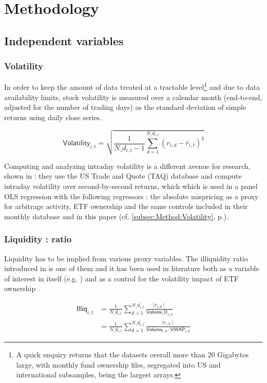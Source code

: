 \section{Methodology}
\label{sec:Methodology}
\subsection{Independent variables}
\subsubsection{Volatility}
In order to keep the amount of data treated at a tractable level\footnote{A quick enquiry returns that the datasets overall more than 20 Gigabytes large, with monthly fund ownership files, segregated into US and international subsamples, being the largest arrays.} and due to data availability limits, stock volatility is measured over a calendar month (end-to-end, adjusted for the number of trading days) as the standard deviation of simple returns using daily close series.

\begin{equation}
  \mathsf{Volatility}_{i, t} = \sqrt{\frac{1}{N\_d_{i, t} - 1} \sum_{d = 1}^{N\_d_{i, t}} (r_{i, d} - \bar{r}_{i, t})^2}
  \end{equation}

Computing and analyzing intraday volatility is a different avenue for research, shown in \textcite{Ben-David2018} : they use the US Trade and Quote (TAQ) database and compute intraday volatility over second-by-second returns, which which is used in a panel OLS regression with the following regressors : the absolute mispricing as a proxy for arbitrage activity, ETF ownership and the same controls included in their monthly database and in this paper (cf. \autoref{subsec:Method:Volatility}, p.\pageref{subsec:Method:Volatility}).
\subsubsection{Liquidity : \textcite{Amihud2002} ratio}
Liquidity has to be implied from various proxy variables. The illiquidity ratio introduced in \textcite{Amihud2002} is one of them and it has been used in literature both as a variable of interest in itself (e.g. \textcite{Israeli2017}) and as a control for the volatility impact of ETF ownership \parencite{Ben-David2018}.

\begin{equation}
  \begin{split}
    \mathsf{Illiq}_{i, t} & = \frac{1}{N\_d_{i, t}} \sum_{d = 1}^{N\_d_{i, t}} \frac{\mid r_{i, d} \mid}{\mathsf{Volume\_D}_{i, d}}\\
    &  = \frac{1}{N\_d_{i, t}} \sum_{d = 1}^{N\_d_{i, t}} \frac{\mid r_{i, d} \mid}{\mathsf{Volume}_{i, d} \cdot \mathsf{VWAP}_{i, d}}
    \end{split}
\end{equation}


